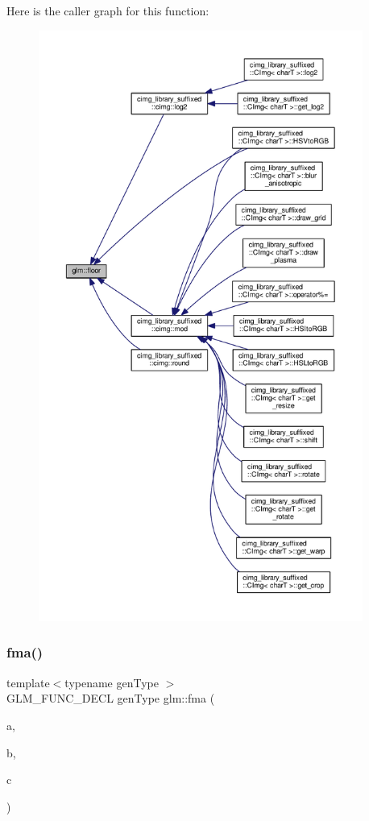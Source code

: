 Here is the caller graph for this function\+:
\nopagebreak
\begin{figure}[H]
\begin{center}
\leavevmode
\includegraphics[height=550pt]{d0/de3/group__core__func__common_gaa9d0742639e85b29c7c5de11cfd6840d_icgraph}
\end{center}
\end{figure}
\mbox{\label{group__core__func__common_gad0f444d4b81cc53c3b6edf5aa25078c2}} 
\subsubsection{\texorpdfstring{fma()}{fma()}}
{\footnotesize\ttfamily template$<$typename gen\+Type $>$ \\
G\+L\+M\+\_\+\+F\+U\+N\+C\+\_\+\+D\+E\+CL gen\+Type glm\+::fma (\begin{DoxyParamCaption}\item[{gen\+Type const \&}]{a,  }\item[{gen\+Type const \&}]{b,  }\item[{gen\+Type const \&}]{c }\end{DoxyParamCaption})}



